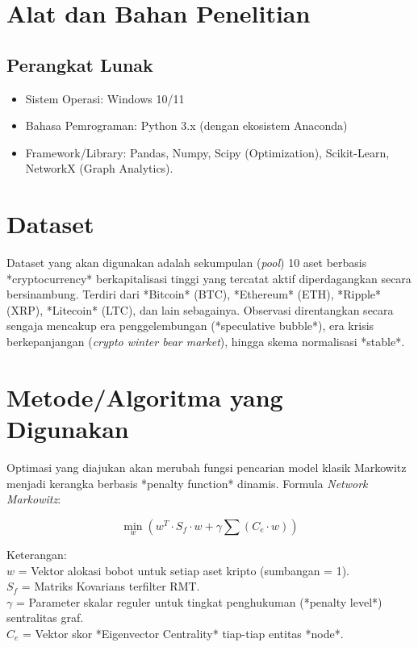\documentclass[12pt, a4paper]{report}
\begin{document}
\section{Alat dan Bahan Penelitian}

\subsection{Perangkat Lunak}
\begin{itemize}
    \item Sistem Operasi: Windows 10/11
    \item Bahasa Pemrograman: Python 3.x (dengan ekosistem Anaconda)
    \item Framework/Library: Pandas, Numpy, Scipy (Optimization), Scikit-Learn, NetworkX (Graph Analytics).
\end{itemize}

\section{Dataset}

Dataset yang akan digunakan adalah sekumpulan (\textit{pool}) 10 aset berbasis *cryptocurrency* berkapitalisasi tinggi yang tercatat aktif diperdagangkan secara bersinambung. Terdiri dari *Bitcoin* (BTC), *Ethereum* (ETH), *Ripple* (XRP), *Litecoin* (LTC), dan lain sebagainya. Observasi direntangkan secara sengaja mencakup era penggelembungan (*speculative bubble*), era krisis berkepanjangan (\textit{crypto winter bear market}), hingga skema normalisasi *stable*.

\section{Metode/Algoritma yang Digunakan}

Optimasi yang diajukan akan merubah fungsi pencarian model klasik Markowitz menjadi kerangka berbasis *penalty function* dinamis. Formula \textit{Network Markowitz}:

\begin{equation}
    \min_{w} \left( w^T \cdot S_f \cdot w + \gamma \sum (C_e \cdot w) \right)
    \label{eq:networkmarkowitz}
\end{equation}

\noindent
Keterangan: \\
$w$ = Vektor alokasi bobot untuk setiap aset kripto (sumbangan = 1). \\
$S_f$ = Matriks Kovarians terfilter RMT. \\
$\gamma$ = Parameter skalar reguler untuk tingkat penghukuman (*penalty level*) sentralitas graf. \\
$C_e$ = Vektor skor *Eigenvector Centrality* tiap-tiap entitas *node*.
\end{document}
